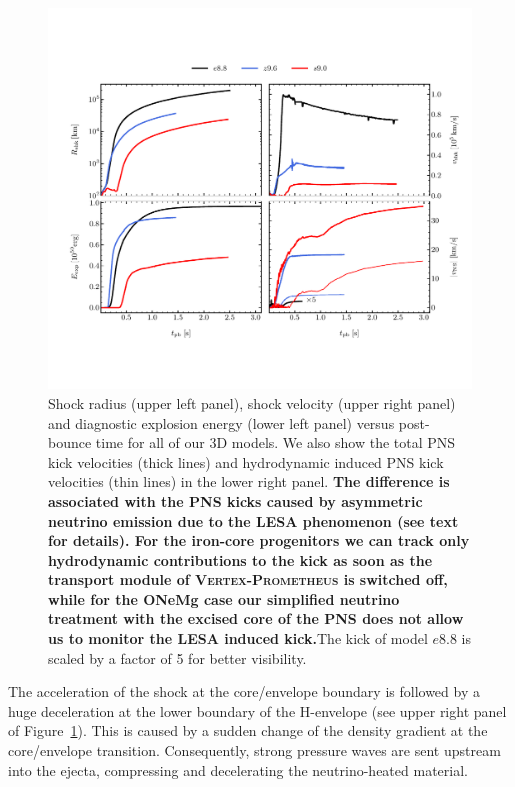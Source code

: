 \documentclass[fleqn,usenatbib]{mnras}
\newcommand{\vertexprom}{\textsc{Vertex-Prometheus}\xspace}
\begin{document}
\begin{figure}
 \centering
 \includegraphics[width=\textwidth,trim=0.1cm 2.1cm 0cm 2.3cm,clip]{./pic/eexp_shk_kick_all_paper.pdf}
 \caption{Shock radius (upper left panel), shock velocity (upper right panel) and diagnostic explosion energy (lower left panel) versus post-bounce time for all of our 3D models. We also show the total PNS kick velocities (thick lines) and hydrodynamic induced PNS kick velocities (thin lines) in the lower right panel. \textbf{The difference is associated with the PNS kicks caused by asymmetric neutrino emission due to the LESA phenomenon (see text for details). For the iron-core progenitors we can track only hydrodynamic contributions to the kick as soon as the transport module of \vertexprom is switched off, while for the ONeMg case our simplified neutrino treatment with the excised core of the PNS does not allow us to monitor the LESA induced kick.}The kick of model $e8.8$ is scaled by a factor of 5 for better visibility. }
\label{fig:eexp all}
\end{figure}

The acceleration of the shock at the core/envelope boundary is followed by a huge deceleration at the lower boundary of the H-envelope (see upper right panel of Figure~\ref{fig:eexp all}). This is caused by a sudden change of the density gradient at the core/envelope transition.  
Consequently, strong pressure waves are sent upstream into the ejecta, compressing and decelerating the neutrino-heated material.
\end{document}
